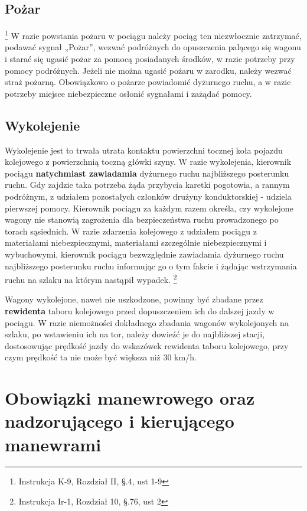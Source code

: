 \section{Pożar}
\footnote{Instrukcja K-9, Rozdział II, \S.4, ust 1-9}
W razie powstania pożaru w pociągu należy pociąg ten niezwłocznie zatrzymać, podawać sygnał „Pożar”, wezwać podróżnych do opuszczenia palącego się wagonu i starać się ugasić pożar za pomocą posiadanych środków, w razie potrzeby przy pomocy podróżnych. Jeżeli nie można ugasić pożaru w zarodku, należy wezwać straż pożarną. Obowiązkowo o pożarze powiadomić dyżurnego ruchu, a w razie potrzeby miejsce niebezpieczne osłonić sygnałami i zażądać pomocy.

\section{Wykolejenie}
Wykolejenie jest to  trwała utrata kontaktu powierzchni tocznej koła pojazdu kolejowego z powierzchnią toczną główki szyny.
W razie wykolejenia, kierownik pociągu \textbf{natychmiast zawiadamia} dyżurnego ruchu najbliższego posterunku ruchu.
Gdy zajdzie taka potrzeba żąda przybycia karetki pogotowia, a rannym podróżnym, z udziałem pozostałych członków drużyny konduktorskiej - udziela pierwszej pomocy. Kierownik pociągu za każdym razem określa, czy wykolejone wagony nie stanowią zagrożenia dla bezpieczeństwa ruchu prowadzonego po torach sąsiednich. W razie zdarzenia kolejowego z udziałem pociągu z materiałami niebezpiecznymi, materiałami szczególnie niebezpiecznymi i wybuchowymi, kierownik pociągu bezwzględnie zawiadamia dyżurnego ruchu najbliższego posterunku ruchu informując go o tym fakcie i żądając wstrzymania ruchu na szlaku na którym nastąpił wypadek.
\footnote{Instrukcja Ir-1, Rozdział 10, \S.76, ust 2}

Wagony wykolejone, nawet nie uszkodzone, powinny być zbadane przez \textbf{rewidenta} taboru kolejowego przed dopuszczeniem ich do dalszej jazdy w pociągu. W razie niemożności dokładnego zbadania wagonów wykolejonych na szlaku, po wstawieniu ich na tor, należy dowieźć je do najbliższej stacji, dostosowując prędkość jazdy do wskazówek rewidenta taboru kolejowego, przy czym prędkość ta nie może być większa niż 30 km/h.

\chapter{Obowiązki manewrowego oraz nadzorującego i kierującego manewrami}

